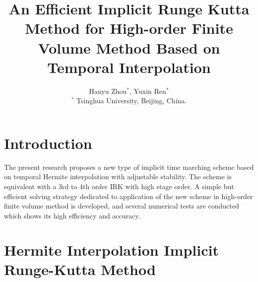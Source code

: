 \documentclass[10pt]{article}
\title{
\bf 
An Efficient Implicit Runge Kutta Method for High-order Finite Volume Method 
Based on Temporal Interpolation 
}
\author{
Hanyu Zhou$^{*}$, Yuxin Ren$^{*}$ \\
$^{*}$ Tsinghua University, Beijing, China.
}
\date{}
\begin{document}
\maketitle
\afterpage{\fancyhead{}}

\centerline{
}
\vskip0.5cm

\section{Introduction}

The present research proposes a new type of implicit time marching
scheme based on temporal Hermite interpolation with adjustable
stability.
The scheme is equivalent with a
3rd to 4th order IRK
with high stage order.
A simple but efficient solving strategy
dedicated to application of the new scheme
in high-order finite volume
method is developed, and several numerical
tests are conducted which shows its
high efficiency and accuracy.

\section{Hermite Interpolation Implicit Runge-Kutta Method}
\end{document}
